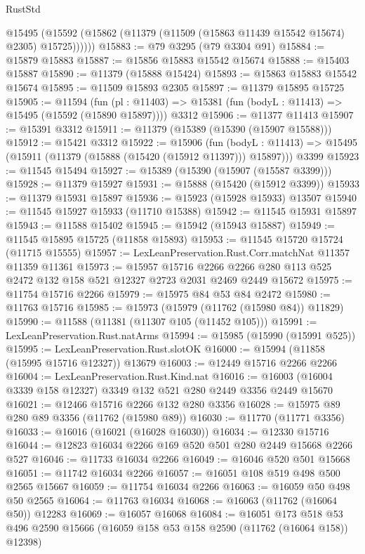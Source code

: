 \begin{lexlean}{RustStd}
\begin{coremodule}
        @15495 (@15592 (@15862 (@11379 (@11509 (@15863 @11439 @15542 @15674) @2305) @15725))))))
@15883 := @79 @3295 (@79 @3304 @91)
@15884 := @15879 @15883
@15887 := @15856 @15883 @15542 @15674
@15888 := @15403 @15887
@15890 := @11379 (@15888 @15424)
@15893 := @15863 @15883 @15542 @15674
@15895 := @11509 @15893 @2305
@15897 := @11379 @15895 @15725
@15905 := @11594
    (fun (pl : @11403) => @15381 (fun (bodyL : @11413) => @15495 (@15592 (@15890 @15897))))
    @3312
@15906 := @11377 @11413
@15907 := @15391 @3312
@15911 := @11379 (@15389 (@15390 (@15907 @15588)))
@15912 := @15421 @3312
@15922 := @15906
    (fun (bodyL : @11413) => @15495 (@15911 (@11379 (@15888 (@15420 (@15912 @11397))) @15897)))
    @3399
@15923 := @11545 @15494
@15927 := @15389 (@15390 (@15907 (@15587 @3399)))
@15928 := @11379 @15927
@15931 := @15888 (@15420 (@15912 @3399))
@15933 := @11379 @15931 @15897
@15936 := @15923 (@15928 @15933) @13507
@15940 := @11545 @15927 @15933 (@11710 @15388)
@15942 := @11545 @15931 @15897
@15943 := @11588 @15402
@15945 := @15942 (@15943 @15887)
@15949 := @11545 @15895 @15725 (@11858 @15893)
@15953 := @11545 @15720 @15724 (@11715 @15555)
@15957 := LexLeanPreservation.Rust.Corr.matchNat @11357 @11359 @11361
@15973 := @15957
    @15716
    @2266
    @2266
    @280
    @113
    @525
    @2472
    @132
    @158
    @521
    @12327
    @2723
    @2031
    @2469
    @2449
    @15672
@15975 := @11754 @15716 @2266
@15979 := @15975 @84 @53 @84 @2472
@15980 := @11763 @15716
@15985 := @15973 (@15979 (@11762 (@15980 @84)) @11829)
@15990 := @11588 (@11381 (@11307 @105 (@11452 @105)))
@15991 := LexLeanPreservation.Rust.natArms
@15994 := @15985 (@15990 (@15991 @525))
@15995 := LexLeanPreservation.Rust.slotOK
@16000 := @15994 (@11858 (@15995 @15716 @12327)) @13679
@16003 := @12449 @15716 @2266 @2266
@16004 := LexLeanPreservation.Rust.Kind.nat
@16016 := @16003 (@16004 @3339 @158 @12327) @3349 @132 @521 @280 @2449 @3356 @2449 @15670
@16021 := @12466 @15716 @2266 @132 @280 @3356
@16028 := @15975 @89 @280 @89 @3356 (@11762 (@15980 @89))
@16030 := @11770 (@11771 @3356)
@16033 := @16016 (@16021 (@16028 @16030))
@16034 := @12330 @15716
@16044 := @12823 @16034 @2266 @169 @520 @501 @280 @2449 @15668 @2266 @527
@16046 := @11733 @16034 @2266
@16049 := @16046 @520 @501 @15668
@16051 := @11742 @16034 @2266
@16057 := @16051 @108 @519 @498 @500 @2565 @15667
@16059 := @11754 @16034 @2266
@16063 := @16059 @50 @498 @50 @2565
@16064 := @11763 @16034
@16068 := @16063 (@11762 (@16064 @50)) @12283
@16069 := @16057 @16068
@16084 := @16051
    @173
    @518
    @53
    @496
    @2590
    @15666
    (@16059 @158 @53 @158 @2590 (@11762 (@16064 @158)) @12398)

\end{coremodule}
\end{lexlean}
